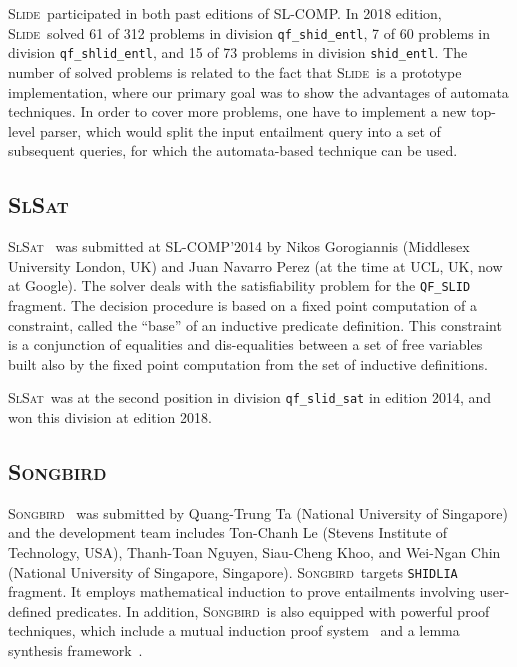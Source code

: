 \documentclass[orivec]{llncs}
\newcommand{\SLIDE}{\textsc{Slide}}
\newcommand{\SLSAT}{\textsc{SlSat}}
\newcommand{\SG}{\textsc{Songbird}}
\newcommand{\slcomp}{\textsf{SL-COMP}}
\begin{document}
\SLIDE\ participated in both past editions of \slcomp. In 2018 edition,
\SLIDE\ solved 61 of 312 problems in division \verb|qf_shid_entl|,
7 of 60 problems in division \verb|qf_shlid_entl|,
and 15 of 73 problems in division \verb|shid_entl|.
The number of solved problems is related to the fact that \SLIDE\ is a prototype implementation, where our primary goal was to show the advantages of automata techniques. In order to cover more problems, one have to implement a new top-level parser, which would split the input entailment query into a set of subsequent queries, for which the automata-based technique can be used.

\subsection{\SLSAT}

\SLSAT~\cite{BrotherstonFPG14} was submitted at \slcomp'2014 by 
Nikos Gorogiannis (Middlesex University London, UK) 
and  Juan Navarro Perez (at the time at UCL, UK, now at Google).
The solver deals with the satisfiability problem for the \verb|QF_SLID| fragment.
The decision procedure is based on a fixed point computation of a constraint, called the ``base'' of an inductive predicate definition. This constraint is a conjunction of equalities and dis-equalities between a set of free variables built also by the fixed point computation from the set of inductive definitions.

\SLSAT\ was at the second position in division \verb|qf_slid_sat| in edition 2014,
and won this division at edition 2018.


\subsection{\SG}

\SG~\cite{SBsite} was submitted by Quang-Trung Ta (National University of Singapore)
and the development team includes 
Ton-Chanh Le (Stevens Institute of Technology, USA),
Thanh-Toan Nguyen, Siau-Cheng Khoo, and 
Wei-Ngan Chin (National University of Singapore, Singapore).
\SG\ targets \verb|SHIDLIA| fragment. It employs mathematical induction 
to prove entailments involving user-defined predicates. In addition, 
\SG\ is also equipped with powerful proof techniques,
which include a mutual induction proof system~\cite{DBLP:conf/fm/TaLKC16} and 
a lemma synthesis framework~\cite{Ta:2017:ALS:3177123.3158097}.
\end{document}
